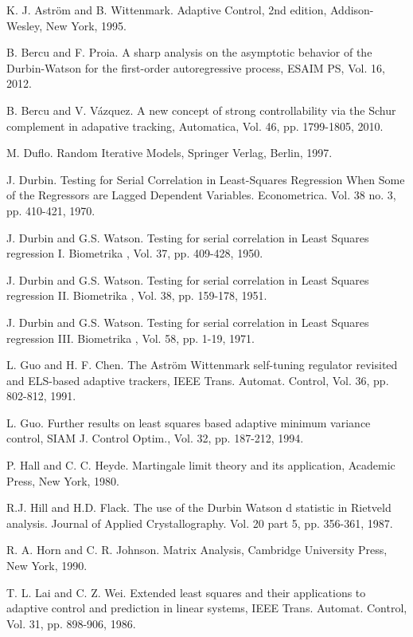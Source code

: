 \documentclass[article,12pt]{amsart}
\numberwithin{equation}{section}
\theoremstyle{plain}
\begin{document}
\begin{thebibliography}{00}
 K. J. Astr\"om and B. Wittenmark. Adaptive Control, 2nd
edition, Addison-Wesley, New York, 1995.

 B. Bercu and F. Proia. A sharp analysis on the
asymptotic behavior of the Durbin-Watson for the first-order autoregressive process, ESAIM PS,
Vol. 16, 2012.

 B. Bercu and V. V\'azquez. A new concept of strong controllability via the Schur complement 
in adapative tracking, Automatica, Vol. 46, pp. 1799-1805, 2010.

 M. Duflo. Random Iterative Models, Springer Verlag, Berlin, 1997.

 J. Durbin. Testing for Serial Correlation in Least-Squares Regression When Some of the Regressors are Lagged Dependent Variables. 
Econometrica. Vol. 38 no. 3, pp. 410-421, 1970.

 J. Durbin and G.S. Watson. Testing for serial correlation in Least Squares regression I. Biometrika , Vol. 37, pp. 409-428, 1950.

 J. Durbin and G.S. Watson. Testing for serial correlation in Least Squares regression II. Biometrika , Vol. 38, pp. 159-178, 1951.

 J. Durbin and G.S. Watson. Testing for serial correlation in Least Squares regression III. Biometrika , Vol. 58, pp. 1-19, 1971.
 
 L. Guo and H. F. Chen. The Astr\"om Wittenmark self-tuning
regulator revisited and ELS-based adaptive trackers, IEEE Trans. Automat.
Control, Vol. 36, pp. 802-812, 1991.

 L. Guo. Further results on least squares based adaptive
minimum variance control, SIAM J. Control Optim., Vol. 32, pp. 187-212, 1994.

 P. Hall and C. C. Heyde. Martingale limit theory and its
application, Academic Press, New York, 1980.

 R.J. Hill and H.D. Flack. The use of the Durbin Watson d statistic in Rietveld analysis. Journal of Applied Crystallography. Vol. 20 part 5, pp. 356-361, 1987.

 R. A. Horn and C. R. Johnson. Matrix Analysis, Cambridge
University Press, New York, 1990.

 T. L. Lai and C. Z. Wei. Extended least squares and their
applications to adaptive control and prediction in linear systems, IEEE
Trans. Automat. Control, Vol. 31, pp. 898-906, 1986.


\end{thebibliography}
\end{document}
